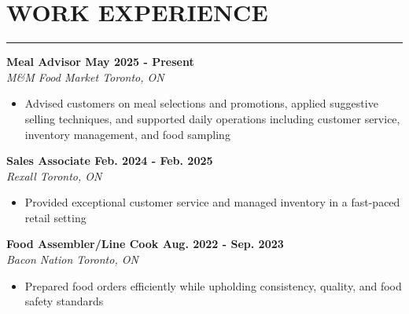 \documentclass[12pt, letterpaper]{article}
\begin{document}
	\section*{WORK EXPERIENCE}
		\noindent\rule{\textwidth}{0.5pt}
		\textbf{Meal Advisor \hfill May 2025 - Present}\\
		\textit{M\&M Food Market \hfill Toronto, ON}
		\begin{itemize}
			\item Advised customers on meal selections and promotions, applied suggestive selling techniques, and supported daily operations including customer service, inventory management, and food sampling
		\end{itemize}
		\textbf{Sales Associate \hfill Feb. 2024 - Feb. 2025}\\
		\textit{Rexall \hfill Toronto, ON}
		\begin{itemize}
			\item Provided exceptional customer service and managed inventory in a fast-paced retail setting
		\end{itemize}
		\textbf{Food Assembler/Line Cook \hfill Aug. 2022 - Sep. 2023}\\
		\textit{Bacon Nation \hfill Toronto, ON}
		\begin{itemize}
			\item Prepared food orders efficiently while upholding consistency, quality, and food safety standards
		\end{itemize}
\end{document}
